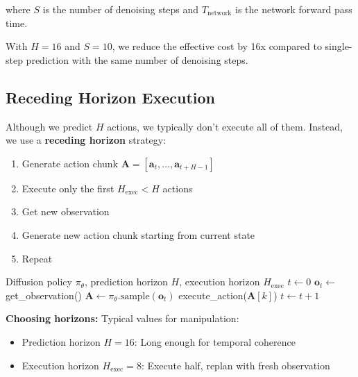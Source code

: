 where $S$ is the number of denoising steps and $T_{\text{network}}$ is the network forward pass time.

With $H = 16$ and $S = 10$, we reduce the effective cost by 16x compared to single-step prediction with the same number of denoising steps.

\subsection{Receding Horizon Execution}
\label{subsec:receding_horizon}

Although we predict $H$ actions, we typically don't execute all of them. Instead, we use a \textbf{receding horizon} strategy:

\begin{enumerate}
    \item Generate action chunk $\mathbf{A} = [\mathbf{a}_t, \ldots, \mathbf{a}_{t+H-1}]$
    \item Execute only the first $H_{\text{exec}} < H$ actions
    \item Get new observation
    \item Generate new action chunk starting from current state
    \item Repeat
\end{enumerate}

\begin{algorithm}[H]
\caption{Receding Horizon Diffusion Policy Execution}
\label{alg:receding_horizon}
\begin{algorithmic}[1]
\REQUIRE Diffusion policy $\pi_\theta$, prediction horizon $H$, execution horizon $H_{\text{exec}}$
\STATE $t \gets 0$
    \STATE $\mathbf{o}_t \gets$ get\_observation()
    \STATE $\mathbf{A} \gets \pi_\theta.\text{sample}(\mathbf{o}_t)$ 
        \STATE execute\_action($\mathbf{A}[k]$)
        \STATE $t \gets t + 1$
    \ENDFOR
\ENDWHILE
\end{algorithmic}
\end{algorithm}

\textbf{Choosing horizons:} Typical values for manipulation:
\begin{itemize}
    \item Prediction horizon $H = 16$: Long enough for temporal coherence
    \item Execution horizon $H_{\text{exec}} = 8$: Execute half, replan with fresh observation
\end{itemize}

